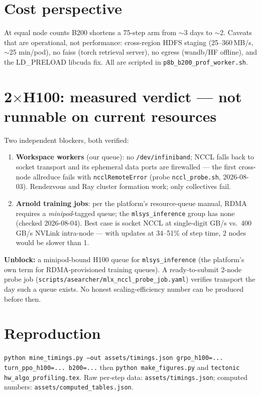 \documentclass[10pt]{article}
\begin{document}
\section{Cost perspective}
At equal node counts B200 shortens a 75-step arm from $\sim$3 days to $\sim$2. Caveats
that are operational, not performance: cross-region HDFS staging (25--360\,MB/s, $\sim$25
min/pod), no faiss (torch retrieval server), no egress (wandb/HF offline), and the
LD\_PRELOAD libcuda fix. All are scripted in \texttt{p8b\_b200\_prof\_worker.sh}.

\section{2$\times$H100: measured verdict — not runnable on current resources}
Two independent blockers, both verified:
\begin{enumerate}\itemsep2pt
  \item \textbf{Workspace workers} (our queue): no \texttt{/dev/infiniband}; NCCL falls back
  to socket transport and its ephemeral data ports are firewalled — the first cross-node
  allreduce fails with \texttt{ncclRemoteError} (probe \texttt{nccl\_probe.sh}, 2026-08-03).
  Rendezvous and Ray cluster formation work; only collectives fail.
  \item \textbf{Arnold training jobs}: per the platform's resource-queue manual, RDMA
  requires a \emph{minipod}-tagged queue; the \texttt{mlsys\_inference} group has none
  (checked 2026-08-04). Best case is socket NCCL at single-digit GB/s vs.\ 400\,GB/s
  NVLink intra-node — with updates at 34--51\% of step time, 2 nodes would be slower than 1.
\end{enumerate}
\textbf{Unblock:} a minipod-bound H100 queue for \texttt{mlsys\_inference} (the platform's
own term for RDMA-provisioned training queues). A ready-to-submit 2-node probe job
(\texttt{scripts/asearcher/mlx\_nccl\_probe\_job.yaml}) verifies transport the day such a
queue exists. No honest scaling-efficiency number can be produced before then.

\section*{Reproduction}
\texttt{python mine\_timings.py --out assets/timings.json grpo\_h100=... turn\_ppo\_h100=...
b200=...} then \texttt{python make\_figures.py} and \texttt{tectonic hw\_algo\_profiling.tex}.
Raw per-step data: \texttt{assets/timings.json}; computed numbers:
\texttt{assets/computed\_tables.json}.
\end{document}

